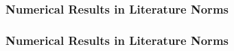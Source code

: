 \begin{frame}
    \frametitle{Numerical Results in Literature Norms}

    \vspace*{\fill}
    \begin{multicols}{2}

        \begin{center}
            \begin{minipage}{0.4\textwidth}
                \begin{figure}[!ht]
                    
                \end{figure}
            \end{minipage}
        \end{center}

        \vfill\null
        \columnbreak

        \begin{center}
            \begin{minipage}{0.4\textwidth}
                \begin{figure}[!ht]
                    
                \end{figure}
            \end{minipage}
        \end{center}

    \end{multicols}
    \vspace*{\fill}
    
\end{frame}

\begin{frame}
    \frametitle{Numerical Results in Literature Norms}

    \vspace*{\fill}
    \begin{multicols}{2}

        \begin{center}
            \begin{minipage}{0.4\textwidth}
                \begin{figure}[!ht]
                    
                \end{figure}
            \end{minipage}
        \end{center}

        \vfill\null
        \columnbreak

        \begin{center}
            \begin{minipage}{0.4\textwidth}
                \begin{figure}[!ht]
                    
                \end{figure}
            \end{minipage}
        \end{center}

    \end{multicols}
    \vspace*{\fill}
    
\end{frame}

